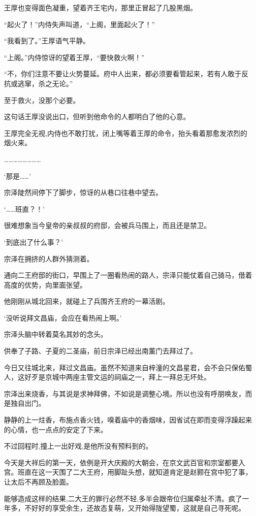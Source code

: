 王厚也变得面色凝重，望着齐王宅内，那里正冒起了几股黑烟。

“起火了！”内侍失声叫道，“上阁，里面起火了！”

“我看到了。”王厚语气平静。

“上阁。”内侍惊讶的望着王厚，“要快救火啊！”

“不，你们注意不要让火势蔓延。府中人出来，都必须要看管起来，若有人敢于反抗或逃窜，杀之无论。”

至于救火，没那个必要。

这句话王厚没说出口，但听到他命令的人都明白了他的心意。

王厚完全无视,内侍也不敢打扰，闭上嘴等着王厚的命令，抬头看着那愈发浓烈的烟火来。

……………………

‘那是……’

宗泽陡然间停下了脚步，惊讶的从巷口往巷中望去。

‘……班直？！’

很难想象当今皇帝的亲叔叔的府邸，会被兵马围上，而且还是禁卫。

‘到底出了什么事？’

宗泽在拥挤的人群外猜测着。

通向二王府邸的街口，早围上了一圈看热闹的路人，宗泽只能仗着自己骑马，借着高度的优势，向里面张望。

他刚刚从城北回来，就碰上了兵围齐王府的一幕活剧。

‘没听说拜文昌庙，会应在看热闹上啊。’

宗泽头脑中转着莫名其妙的念头。

供奉了子路、子夏的二圣庙，前日宗泽已经出南薰门去拜过了。

今日又往城北来，拜过文昌庙。虽然不知道来自梓潼的文昌星君，会不会只保佑蜀人，这好歹是京城中两座主管文运的祠庙之一，拜上一拜总无坏处。

宗泽出来烧香，与其说是求神拜佛，不如说是调整心境。所以也没有呼朋唤友，而是独自出门。

静静的上一炷香，布施点香火钱，嗅着庙中的香烟味，因省试在即而变得浮躁起来的心情，也一点点的安定了下来。

不过回程时,撞上一出好戏,是他所没有预料到的。

今天是大祥后的第一天，依例是开大庆殿的大朝会，在京文武百官和宗室都要入宫。班直在这一天围了二大王府，用脚趾头想，就知道肯定是赵颢在宫中犯了事，让太后不再顾及脸面。

能够造成这样的结果,二大王的罪行必然不轻,多半会跟帝位归属牵扯不清。疯了一年多，不好好的享受余生，还故态复萌，又开始得陇望蜀，这就是自己寻死呢。

